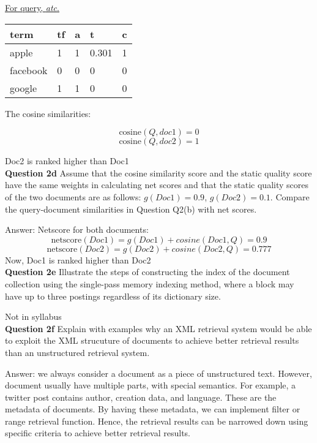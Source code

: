 \documentclass[11pt,a4paper]{report}
\begin{document}
\begin{multicols*}{2}
\noindent \underline{For query, \textit{atc}.}

\begin{center}
\begin{tabular}{|l | l | l | l | l |}
    \hline
    term     & tf & a & t & c \\
    \hline
    apple    & 1  & 1 & 0.301 & 1\\
    facebook & 0  & 0 & 0 & 0\\
    google   & 1  & 1 & 0 & 0 \\
    \hline
\end{tabular}
\end{center}

\noindent The cosine similarities:

$$\text{cosine}(Q, doc1) = 0$$
$$\text{cosine}(Q, doc2) = 1$$

\noindent Doc2 is ranked higher than Doc1\\

\noindent \textbf{Question 2d} Assume that the cosine similarity score and the static quality score have the same weights in calculating net scores and that the static quality scores of the two documents are as follows: $g(Doc1)=0.9$, $g(Doc2)=0.1$. Compare the query-document similarities in Question Q2(b) with net scores.

\noindent Answer: Netscore for both documents:
$$\text{netscore}(Doc1) = g(Doc1) + cosine(Doc1, Q) = 0.9$$
$$\text{netscore}(Doc2) = g(Doc2) + cosine(Doc2, Q) = 0.777$$
\noindent Now, Doc1 is ranked higher than Doc2 \\

\noindent \textbf{Question 2e} Illustrate the steps of constructing the index of the document collection using the single-pass memory indexing method, where a block may have up to three postings regardless of its dictionary size. 

\noindent Not in syllabus \\

\noindent \textbf{Question 2f} Explain with examples why an XML retrieval system would be able to exploit the XML strucuture of documents to achieve better retrieval results than an unstructured retrieval system. 

\noindent Answer: we always consider a document as a piece of unstructured text. However, document usually have multiple parts, with special semantics. For example, a twitter post contains author, creation data, and language. These are the metadata of documents. By having these metadata, we can implement filter or range retrieval function. Hence, the retrieval results can be narrowed down using specific criteria to achieve better retrieval results. 


\end{multicols*}
\end{document}
